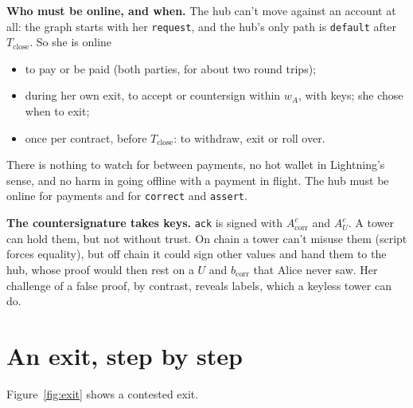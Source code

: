 \documentclass[11pt]{article}
\theoremstyle{plain}
\theoremstyle{definition}
\newcommand{\Tc}{T_{\mathrm{close}}}
\newcommand{\bcorr}{b_{\mathrm{corr}}}
\newcommand{\tx}[1]{\texttt{#1}}
\newcommand{\Acorr}{A_{\mathrm{corr}}^{c}}
\newcommand{\AU}{A_{U}^{c}}
\begin{document}
\textbf{Who must be online, and when.} The hub can't move against an
account at all: the graph starts with her \tx{request}, and the hub's
only path is \tx{default} after $\Tc$. So she is online
\begin{itemize}[nosep]
\item to pay or be paid (both parties, for about two round trips);
\item during her own exit, to accept or countersign within $w_A$, with
  keys; she chose when to exit;
\item once per contract, before $\Tc$: to withdraw, exit or roll over.
\end{itemize}
There is nothing to watch for between payments, no hot wallet in
Lightning's sense, and no harm in going offline with a payment in
flight. The hub must be online for payments and for \tx{correct} and
\tx{assert}.

\textbf{The countersignature takes keys.} \tx{ack} is signed with
$\Acorr$ and $\AU$. A tower can hold them, but not without trust. On
chain a tower can't misuse them (script forces equality), but off chain
it could sign other values and hand them to the hub, whose proof would
then rest on a $U$ and $\bcorr$ that Alice never saw. Her challenge of
a false proof, by contrast, reveals labels, which a keyless tower can
do.

\section{An exit, step by step}\label{sec:example}

Figure~\ref{fig:exit} shows a contested exit.
\end{document}

